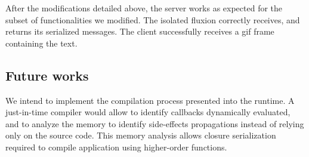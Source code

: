 


After the modifications detailed above, the server works as expected for the subset of functionalities we modified.
The isolated fluxion correctly receives, and returns its serialized messages.
The client successfully receives a gif frame containing the text.

\subsection{Future works}

We intend to implement the compilation process presented into the runtime.
A just-in-time compiler would allow to identify callbacks dynamically evaluated, and to analyze the memory to identify side-effects propagations instead of relying only on the source code.
This memory analysis allows closure serialization required to compile application using higher-order functions.



